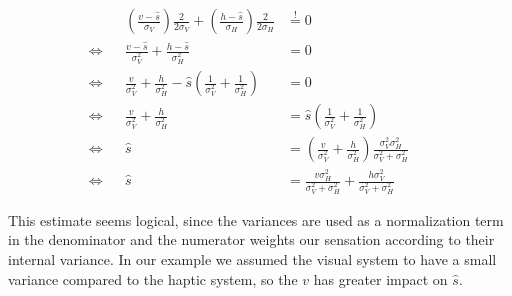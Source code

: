 \documentclass[../main/Notes.tex]{subfiles}
\begin{document}
\begin{align*}
& & \left(\frac{v-\hat{s}}{\sigma_{V}}\right) \frac{2}{2\sigma_{V}} + \left(\frac{h-\hat{s}}{\sigma_{H}}\right) \frac{2}{2\sigma_{H}} & \stackrel{!}{=}0 & & \\
\Leftrightarrow & & \frac{v-\hat{s}}{\sigma_{V}^{2}} + \frac{h-\hat{s}}{\sigma_{H}^{2}} & = 0 & & \\
\Leftrightarrow & & \frac{v}{\sigma_{V}^{2}} + \frac{h}{\sigma_{H}^{2}} -\hat{s} \left(\frac{1}{\sigma_{V}^{2}} + \frac{1}{\sigma_{H}^{2}}\right) & = 0 & & \\
\Leftrightarrow & & \frac{v}{\sigma_{V}^{2}} + \frac{h}{\sigma_{H}^{2}} & = \hat{s} \left(\frac{1}{\sigma_{V}^{2}} + \frac{1}{\sigma_{H}^{2}}\right) & & \\
\Leftrightarrow & & \hat{s} & = \left(\frac{v}{\sigma_{V}^{2}} + \frac{h}{\sigma_{H}^{2}}\right) \frac{\sigma_{V}^{2}\sigma_{H}^{2}}{\sigma_{V}^{2} + \sigma_{H}^{2}} & & \\
\Leftrightarrow & & \hat{s} & = \frac{v\sigma_{H}^{2}}{\sigma_{V}^{2} + \sigma_{H}^{2}} + \frac{h\sigma_{V}^{2}}{\sigma_{V}^{2} + \sigma_{H}^{2}} & &
\end{align*}

This estimate seems logical, since the variances are used as a normalization term in the denominator and the numerator weights our sensation according to their internal variance. In our example we assumed the visual system to have a small variance compared to the haptic system, so the $v$ has greater impact on $\hat{s}$.
\end{document}
